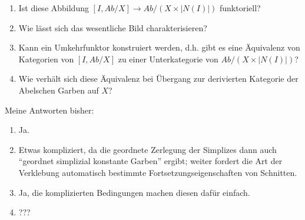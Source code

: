 \documentclass[a4paper]{article}
\begin{document}
\begin{enumerate}
\item Ist diese Abbildung $[I, Ab/X] \to Ab/(X \times |N(I)|)$
  funktoriell?
\item Wie lässt sich das wesentliche Bild charakterisieren?
\item Kann ein Umkehrfunktor konstruiert werden, d.h. gibt es eine
  Äquivalenz von Kategorien von $[I, Ab/X]$ zu einer Unterkategorie
  von $Ab/(X \times |N(I)|)$?
\item Wie verhält sich diese Äquivalenz bei Übergang zur derivierten
  Kategorie der Abelschen Garben auf $X$?
\end{enumerate}

Meine Antworten bisher:

\begin{enumerate}
\item Ja.
\item Etwas kompliziert, da die geordnete Zerlegung der Simplizes dann
  auch ``geordnet simplizial konstante Garben'' ergibt; weiter fordert
  die Art der Verklebung automatisch bestimmte
  Fortsetzungseigenschaften von Schnitten.
\item Ja, die komplizierten Bedingungen machen diesen dafür einfach.
\item ???
\end{enumerate}
\end{document}
